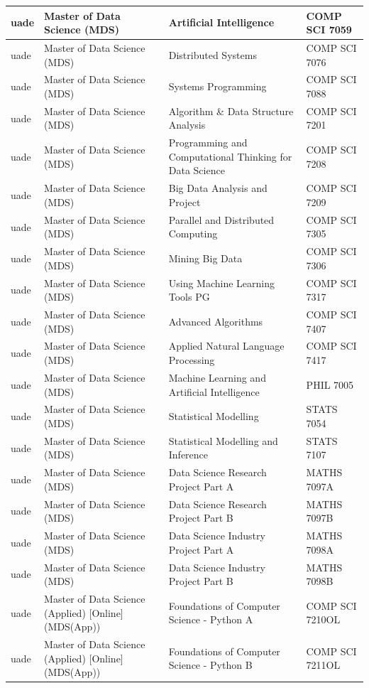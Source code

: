 \documentclass[
  letterpaper,
  DIV=11,
  numbers=noendperiod]{scrreport}
\begin{document}
\begin{table}
\begin{tabular}{l|l|l|l}
\hline
uade & Master of Data Science (MDS) & Artificial Intelligence & COMP SCI 7059\\
\hline
uade & Master of Data Science (MDS) & Distributed Systems & COMP SCI 7076\\
\hline
uade & Master of Data Science (MDS) & Systems Programming & COMP SCI 7088\\
\hline
uade & Master of Data Science (MDS) & Algorithm \& Data Structure Analysis & COMP SCI 7201\\
\hline
uade & Master of Data Science (MDS) & Programming and Computational Thinking for Data Science & COMP SCI 7208\\
\hline
uade & Master of Data Science (MDS) & Big Data Analysis and Project & COMP SCI 7209\\
\hline
uade & Master of Data Science (MDS) & Parallel and Distributed Computing & COMP SCI 7305\\
\hline
uade & Master of Data Science (MDS) & Mining Big Data & COMP SCI 7306\\
\hline
uade & Master of Data Science (MDS) & Using Machine Learning Tools PG & COMP SCI 7317\\
\hline
uade & Master of Data Science (MDS) & Advanced Algorithms & COMP SCI 7407\\
\hline
uade & Master of Data Science (MDS) & Applied Natural Language Processing & COMP SCI 7417\\
\hline
uade & Master of Data Science (MDS) & Machine Learning and Artificial Intelligence & PHIL 7005\\
\hline
uade & Master of Data Science (MDS) & Statistical Modelling & STATS 7054\\
\hline
uade & Master of Data Science (MDS) & Statistical Modelling and Inference & STATS 7107\\
\hline
uade & Master of Data Science (MDS) & Data Science Research Project Part A & MATHS 7097A\\
\hline
uade & Master of Data Science (MDS) & Data Science Research Project Part B & MATHS 7097B\\
\hline
uade & Master of Data Science (MDS) & Data Science Industry Project Part A & MATHS 7098A\\
\hline
uade & Master of Data Science (MDS) & Data Science Industry Project Part B & MATHS 7098B\\
\hline
uade & Master of Data Science (Applied) [Online] (MDS(App)) & Foundations of Computer Science - Python A & COMP SCI 7210OL\\
\hline
uade & Master of Data Science (Applied) [Online] (MDS(App)) & Foundations of Computer Science - Python B & COMP SCI 7211OL\\

\end{tabular}
\end{table}
\end{document}
